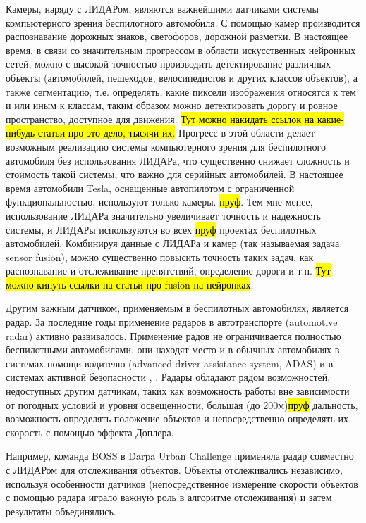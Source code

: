 Камеры, наряду с ЛИДАРом, являются важнейшими датчиками системы компьютерного зрения беспилотного автомобиля.
С помощью камер производится распознавание дорожных знаков, светофоров, дорожной разметки. В настоящее время,
в связи со значительным прогрессом в области искусственных нейронных сетей, можно с высокой точностью производить
детектирование различных объекты (автомобилей, пешеходов, велосипедистов и других классов объектов), а также
сегментацию, т.е. определять, какие пиксели изображения относятся к тем и или иным к классам, таким образом
можно детектировать дорогу и ровное пространство, доступное для движения. \hl{Тут можно накидать ссылок на какие-нибудь
статьи про это дело, тысячи их.} Прогресс в этой области делает возможным реализацию системы компьютерного
зрения для беспилотного автомобиля без использования ЛИДАРа, что существенно снижает сложность и стоимость такой
системы, что важно для серийных автомобилей. В настоящее время автомобили Tesla, оснащенные автопилотом
с ограниченной функциональностью, используют только камеры. \hl{пруф}. Тем мне менее, использование ЛИДАРа
значительно увеличивает точность и надежность системы, и ЛИДАРы используются во всех \hl{пруф} проектах
беспилотных автомобилей. Комбинируя данные с ЛИДАРа и камер (так называемая задача sensor fusion), можно
существенно повысить точность таких задач, как распознавание и отслеживание препятствий, определение дороги
и т.п. \hl{Тут можно кинуть ссылки на статьи про fusion на нейронках}.

Другим важным датчиком, применяемым в беспилотных автомобилях, является радар. За последние годы применение радаров
в автотранспорте (automotive radar) активно развивалось. Применение радов не ограничивается полностью беспилотными
автомобилями, они находят место и в обычных автомобилях в системах помощи водителю (advanced driver-assistance
system, ADAS) и в системах активной безопасности \cite{sensor_radar_overview}, \cite{sensor_radar_overview_2}.
Радары обладают рядом возможностей, недоступных другим датчикам, таких как возможность работы вне зависимости от
погодных условий и уровня освещенности, большая (до 200м)\hl{пруф} дальность, возможность определять положение
объектов и непосредственно определять их скорость с помощью эффекта Доплера.

Например, команда BOSS \cite{darpa_boss} в Darpa Urban Challenge применяла радар совместно с ЛИДАРом для отслеживания
объектов. Объекты отслеживались независимо, используя особенности датчиков (непосредственное измерение скорости объектов
с помощью радара играло важную роль в алгоритме отслеживания) и затем результаты объединялись.

